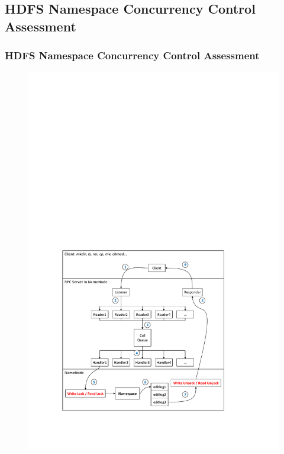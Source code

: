 \documentclass{beamer}
\begin{document}
\subsection{HDFS Namespace Concurrency Control Assessment}
\begin{frame}
	\frametitle{HDFS Namespace Concurrency Control Assessment}
		\begin{figure}[h]
			\centering
			\includegraphics[scale=0.42]{figs/nnRPC.pdf}
		\end{figure}
\end{frame}
\end{document}
